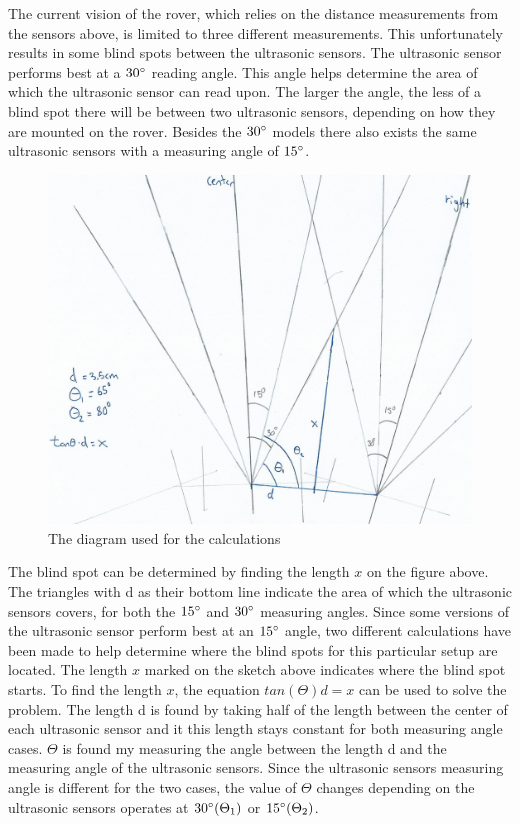\begin{figure}[H]
\begin{subfigure}[H]{0.4\textwidth}
		\label{measuringangle}
	\end{subfigure}
\end{figure}

The current vision of the rover, which relies on the distance measurements from the sensors above, is limited to three different measurements. This unfortunately results in some blind spots between the ultrasonic sensors.
The ultrasonic sensor performs best at a $30\degree$ reading angle. This angle helps determine the area of which the ultrasonic sensor can read upon. The larger the angle, the less of a blind spot there will be between two ultrasonic sensors, depending on how they are mounted on the rover\cite{hcsr40datesheet}. Besides the $30\degree$ models there also exists the same ultrasonic sensors with a measuring angle of $15\degree$.

\clearpage
\begin{figure}[H]
	\centering
	\includegraphics[width=0.8\linewidth]{images/blindspot_calc.jpg}
	\caption{The diagram used for the calculations}
	\label{calculationdiagram}
\end{figure}

The blind spot can be determined by finding the length $x$ on the figure above. The triangles with d as their bottom line indicate the area of which the ultrasonic sensors covers, for both the $15\degree$ and $30\degree$ measuring angles. Since some versions of the ultrasonic sensor perform best at an $15\degree$ angle, two different calculations have been made to help determine where the blind spots for this particular setup are located.
The length $x$ marked on the sketch above indicates where the blind spot starts. To find the length $x$, the equation $tan(\Theta)d = x$ can be used to solve the problem. The length d is found by taking half of the length between the center of each ultrasonic sensor and it this length stays constant for both measuring angle cases. $\Theta$ is found my measuring the angle between the length d and the measuring angle of the ultrasonic sensors. Since the ultrasonic sensors measuring angle is different for the two cases, the value of $\Theta$ changes depending on the ultrasonic sensors operates at $30\degree (\Theta_1)$ or $15\degree (\Theta_2)$.

